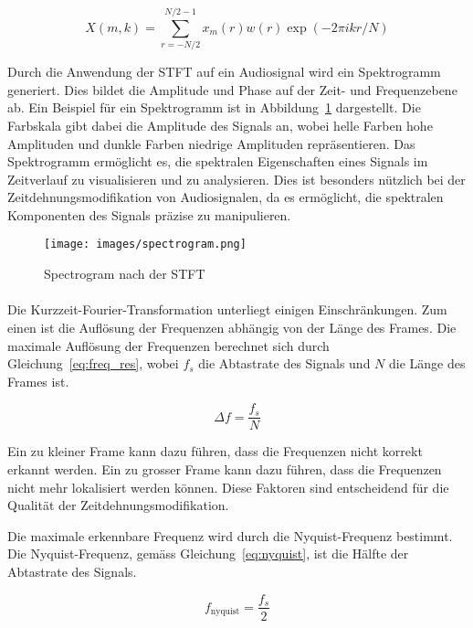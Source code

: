 \begin{equation}
    \label{eq:stft}
    X(m,k)=\sum_{r=-N/2}^{N/2-1}x_m(r)w(r)\exp(-2\pi ikr/N)
\end{equation}

Durch die Anwendung der STFT auf ein Audiosignal wird ein Spektrogramm generiert. Dies bildet die Amplitude und Phase auf der Zeit- und Frequenzebene ab. Ein Beispiel für ein Spektrogramm ist in Abbildung~\ref{fig:spectrogram} dargestellt. Die Farbskala gibt dabei die Amplitude des Signals an, wobei helle Farben hohe Amplituden und dunkle Farben niedrige Amplituden repräsentieren. Das Spektrogramm ermöglicht es, die spektralen Eigenschaften eines Signals im Zeitverlauf zu visualisieren und zu analysieren. Dies ist besonders nützlich bei der Zeitdehnungsmodifikation von Audiosignalen, da es ermöglicht, die spektralen Komponenten des Signals präzise zu manipulieren.

\begin{figure}[H]
    \centering
    \texttt{[image: images/spectrogram.png]}
    \caption{Spectrogram nach der STFT}
    \label{fig:spectrogram}
\end{figure}

\paragraph{}
Die Kurzzeit-Fourier-Transformation unterliegt einigen Einschränkungen. Zum einen ist die Auflösung der Frequenzen abhängig von der Länge des Frames. Die maximale Auflösung der Frequenzen berechnet sich durch Gleichung~\eqref{eq:freq_res}, wobei $f_s$ die Abtastrate des Signals und $N$ die Länge des Frames ist.

\begin{equation}
    \label{eq:freq_res}
    \Delta f = \frac{f_s}{N}
\end{equation}

Ein zu kleiner Frame kann dazu führen, dass die Frequenzen nicht korrekt erkannt werden. Ein zu grosser Frame kann dazu führen, dass die Frequenzen nicht mehr lokalisiert werden können. Diese Faktoren sind entscheidend für die Qualität der Zeitdehnungsmodifikation.

Die maximale erkennbare Frequenz wird durch die Nyquist-Frequenz bestimmt. Die Nyquist-Frequenz, gemäss Gleichung~\eqref{eq:nyquist}, ist die Hälfte der Abtastrate des Signals.

\begin{equation}
    \label{eq:nyquist}
    f_{\text{nyquist}} = \frac{f_s}{2}
\end{equation}

